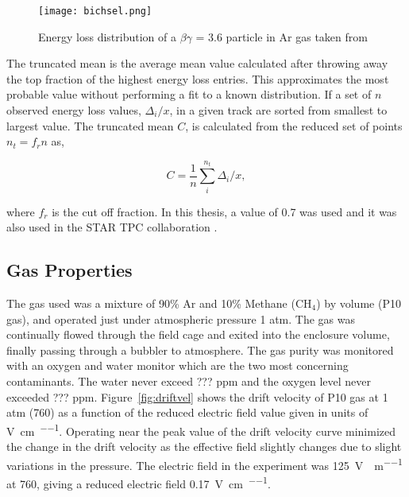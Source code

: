 \begin{figure}
\texttt{[image: bichsel.png]}
\caption{Energy loss distribution of a $\beta\gamma$ = 3.6 particle in Ar gas taken from \cite{bichsel}}
\label{fig:straggling}
\end{figure}

The truncated mean is the average mean value calculated after throwing away the top fraction of the highest energy loss entries. This approximates the most probable value without performing a fit to a known distribution. If a set of $n$ observed energy loss values, $\Delta_i/x$, in a given track are sorted from smallest to largest value. The truncated mean $C$, is calculated from the reduced set of points $n_t = f_r n$ as,

\begin{equation}
C = \frac{1}{n} \sum\limits_{i}^{n_t} \Delta_i/x,
\label{eq:truncmean}
\end{equation}

where $f_r$ is the cut off fraction. In this thesis, a value of 0.7 was used and it was also used in the STAR TPC collaboration \cite{starsyst}. 








\subsection{Gas Properties}
The gas used was a mixture of 90\% Ar and 10\% Methane ($\mathrm{CH_4}$) by volume (P10 gas), and operated just under atmospheric pressure 1 atm. The gas was continually flowed through the field cage and exited into the enclosure volume, finally passing through a bubbler to atmosphere. The gas purity was monitored with an oxygen and water monitor which are the two most concerning contaminants. The water never exceed  ??? ppm  and the oxygen level never exceeded ??? ppm. Figure~\ref{fig:driftvel} shows the drift velocity of P10 gas at 1 atm (\SI{760}{\torr}) as a function of the reduced electric field value given in units of \si{\volt\per\centi\metre\per\torr}. Operating near the peak value of the drift velocity curve minimized the change in the drift velocity as the effective field slightly changes due to slight variations in the pressure. The electric field in the experiment was \SI{125}{\volt\per\centi\per\metre} at \SI{760}{\torr}, giving a reduced electric field \SI{0.17}{\volt\per\centi\metre\per\torr}.

